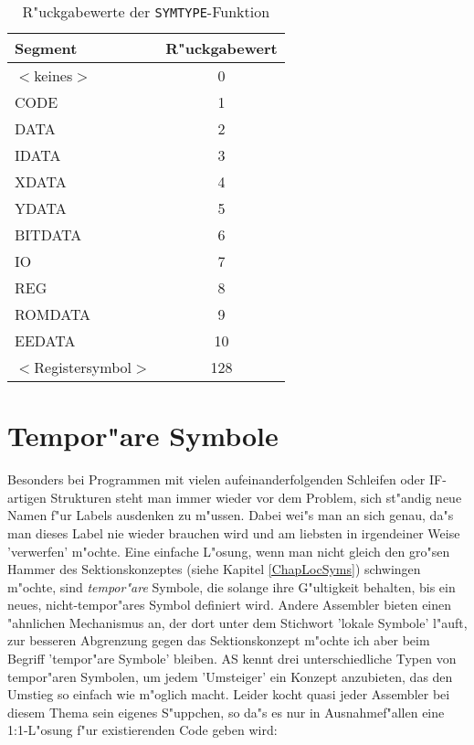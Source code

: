 \documentclass[12pt,a4paper,twoside]{report}
\newcommand{\tty}[1]{{\tt #1}}
\begin{document}
\begin{table}[htb]
\begin{center}
\begin{tabular}{|l|c|}
\hline
Segment & R"uckgabewert \\
\hline
$<$keines$>$ & 0 \\
CODE & 1 \\
DATA & 2 \\
IDATA & 3 \\
XDATA & 4 \\
YDATA & 5 \\
BITDATA & 6 \\
IO & 7 \\
REG & 8 \\
ROMDATA & 9 \\
EEDATA & 10 \\
$<$Registersymbol$>$ & 128 \\
\hline
\end{tabular}
\end{center}
\caption{R"uckgabewerte der \tty{SYMTYPE}-Funktion\label{TabSegNums}}
\end{table}


\section{Tempor"are Symbole}

Besonders bei Programmen mit vielen aufeinanderfolgenden Schleifen oder
IF-artigen Strukturen steht man immer wieder vor dem Problem, sich
st"andig neue Namen f"ur Labels ausdenken zu m"ussen.  Dabei wei"s man an
sich genau, da"s man dieses Label nie wieder brauchen wird und am liebsten
in irgendeiner Weise 'verwerfen' m"ochte.  Eine einfache L"osung, wenn man
nicht gleich den gro"sen Hammer des Sektionskonzeptes (siehe Kapitel
\ref{ChapLocSyms}) schwingen m"ochte, sind {\em tempor"are} Symbole, die
solange ihre G"ultigkeit behalten, bis ein neues, nicht-tempor"ares Symbol
definiert wird.  Andere Assembler bieten einen "ahnlichen Mechanismus an,
der dort unter dem Stichwort 'lokale Symbole' l"auft, zur besseren
Abgrenzung gegen das Sektionskonzept m"ochte ich aber beim Begriff
'tempor"are Symbole' bleiben.  AS kennt drei unterschiedliche Typen von
tempor"aren Symbolen, um jedem 'Umsteiger' ein Konzept anzubieten, das den
Umstieg so einfach wie m"oglich macht.  Leider kocht quasi jeder Assembler
bei diesem Thema sein eigenes S"uppchen, so da"s es nur in Ausnahmef"allen
eine 1:1-L"osung f"ur existierenden Code geben wird:
\end{document}

